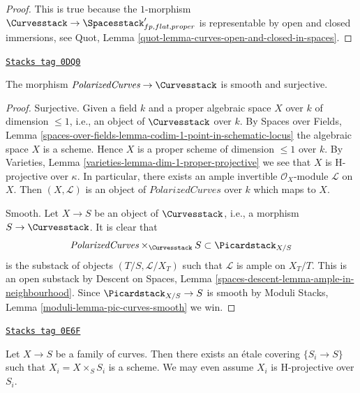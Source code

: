 \begin{proof}
This is true because the $1$-morphism
$\Curvesstack \to \Spacesstack'_{fp, flat, proper}$
is representable by open and closed immersions, see
Quot, Lemma \ref{quot-lemma-curves-open-and-closed-in-spaces}.
\end{proof}

\begin{lemma}
\label{moduli-curves-lemma-polarized-curves-over-curves}
\href{https://stacks.math.columbia.edu/tag/0DQ0}{\texttt{Stacks tag 0DQ0}}

The morphism
$\textit{PolarizedCurves} \to \Curvesstack$
is smooth and surjective.
\end{lemma}

\begin{proof}
Surjective. Given a field $k$ and a proper algebraic space
$X$ over $k$ of dimension $\leq 1$, i.e., an object of $\Curvesstack$ over $k$.
By Spaces over Fields, Lemma
\ref{spaces-over-fields-lemma-codim-1-point-in-schematic-locus}
the algebraic space $X$ is a scheme. Hence $X$
is a proper scheme of dimension $\leq 1$ over $k$.
By Varieties, Lemma \ref{varieties-lemma-dim-1-proper-projective}
we see that $X$ is H-projective over $\kappa$.
In particular, there exists an ample invertible $\mathcal{O}_X$-module
$\mathcal{L}$ on $X$. Then $(X, \mathcal{L})$ is an object
of $\textit{PolarizedCurves}$ over
$k$ which maps to $X$.

\medskip\noindent
Smooth. Let $X \to S$ be an object of $\Curvesstack$, i.e., a
morphism $S \to \Curvesstack$. It is clear that
$$
\textit{PolarizedCurves}
\times_{\Curvesstack} S
\subset \Picardstack_{X/S}
$$
is the substack of objects $(T/S, \mathcal{L}/X_T)$ such that
$\mathcal{L}$ is ample on $X_T/T$. This is an open substack by
Descent on Spaces, Lemma \ref{spaces-descent-lemma-ample-in-neighbourhood}.
Since $\Picardstack_{X/S} \to S$ is smooth by
Moduli Stacks, Lemma \ref{moduli-lemma-pic-curves-smooth}
we win.
\end{proof}

\begin{lemma}
\label{moduli-curves-lemma-etale-locally-scheme}
\href{https://stacks.math.columbia.edu/tag/0E6F}{\texttt{Stacks tag 0E6F}}

Let $X \to S$ be a family of curves.
Then there exists an \'etale covering $\{S_i \to S\}$
such that $X_i = X \times_S S_i$ is a scheme. We may even
assume $X_i$ is H-projective over $S_i$.
\end{lemma}

